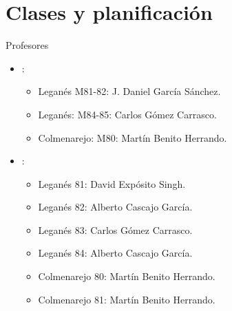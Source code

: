 \section{Clases y planificación}

\begin{frame}[t]{Profesores}
\begin{itemize}
  \item {}: 
    \begin{itemize}
      \item Leganés M81-82: J. Daniel García Sánchez.
      \item Leganés: M84-85: Carlos Gómez Carrasco.
      \item Colmenarejo: M80: Martín Benito Herrando.
    \end{itemize}
  \item {}: 
    \begin{itemize}
      \item Leganés 81: David Expósito Singh.
      \item Leganés 82: Alberto Cascajo García.
      \item Leganés 83: Carlos Gómez Carrasco.
      \item Leganés 84: Alberto Cascajo García.
      \item Colmenarejo 80: Martín Benito Herrando.
      \item Colmenarejo 81: Martín Benito Herrando.
    \end{itemize}
\end{itemize}
\end{frame}
